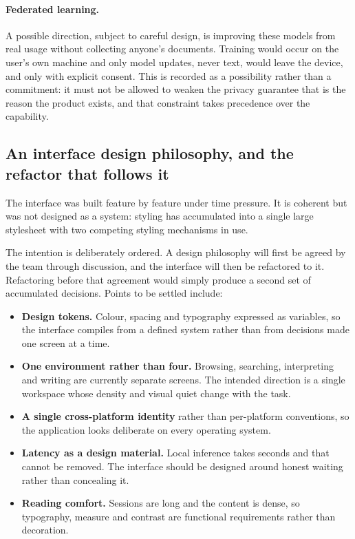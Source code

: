 \documentclass[11pt,a4paper]{article}
\begin{document}
\paragraph{Federated learning.} A possible direction, subject to careful design,
is improving these models from real usage without collecting anyone's documents.
Training would occur on the user's own machine and only model updates, never
text, would leave the device, and only with explicit consent. This is recorded
as a possibility rather than a commitment: it must not be allowed to weaken the
privacy guarantee that is the reason the product exists, and that constraint
takes precedence over the capability.

\subsection{An interface design philosophy, and the refactor that follows it}

The interface was built feature by feature under time pressure. It is coherent
but was not designed as a system: styling has accumulated into a single large
stylesheet with two competing styling mechanisms in use.

The intention is deliberately ordered. A design philosophy will first be agreed
by the team through discussion, and the interface will then be refactored to it.
Refactoring before that agreement would simply produce a second set of
accumulated decisions. Points to be settled include:

\begin{itemize}[leftmargin=*]
  \item \textbf{Design tokens.} Colour, spacing and typography expressed as
        variables, so the interface compiles from a defined system rather than
        from decisions made one screen at a time.
  \item \textbf{One environment rather than four.} Browsing, searching,
        interpreting and writing are currently separate screens. The intended
        direction is a single workspace whose density and visual quiet change
        with the task.
  \item \textbf{A single cross-platform identity} rather than per-platform
        conventions, so the application looks deliberate on every operating
        system.
  \item \textbf{Latency as a design material.} Local inference takes seconds and
        that cannot be removed. The interface should be designed around honest
        waiting rather than concealing it.
  \item \textbf{Reading comfort.} Sessions are long and the content is dense, so
        typography, measure and contrast are functional requirements rather than
        decoration.
\end{itemize}
\end{document}
